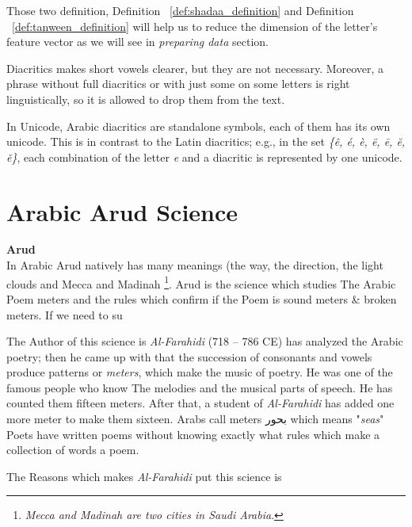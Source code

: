 Those two definition, Definition ~\ref{def:shadaa_definition} and Definition ~\ref{def:tanween_definition}  will help us to reduce the dimension of the letter's feature vector as we will see in \textit{preparing data} section.


Diacritics makes short vowels clearer, but they are not necessary.
Moreover, a phrase without full diacritics or with just some on some letters is
right linguistically, so it is allowed to drop them from the text.

In Unicode, Arabic diacritics are standalone symbols, each of them has its own
unicode. This is in contrast to the Latin diacritics; e.g., in the set
\textit{\{ê, é, è, ë, ē, ĕ, ě\}}, each combination of the letter \textit{e} and a diacritic is represented by one unicode.

\newpage

\section{Arabic Arud Science}



\begin{definition}\label{def:arud}
  \textbf{Arud} \hfill \\
  In Arabic Arud natively has many meanings (the way, the direction, the light clouds and Mecca and Madinah \footnote{\textit{Mecca and Madinah are two cities in  Saudi Arabia}.}\cite{AlQuaed}. Arud is the science which studies The Arabic Poem meters and the rules which confirm if the Poem is sound meters \& broken meters. If we need to su
\end{definition}
 
The Author of this science is \textit{Al-Farahidi} (718 – 786 CE) has analyzed the
Arabic poetry; then he came up with that the succession of consonants and vowels
produce patterns or \textit{meters}, which make the music of poetry. He was one of the famous people who know The melodies and the musical parts of speech. He has
counted them fifteen meters.  After that, a student of \textit{Al-Farahidi} has
added one more meter to make them sixteen. Arabs call meters \textarabic{بحور}
which means "\textit{seas}" Poets have written poems without knowing exactly what rules which make a collection of words a poem.

The Reasons which makes \textit{Al-Farahidi} put this science is


